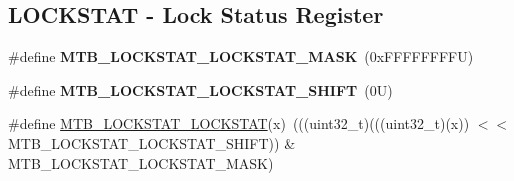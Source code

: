 \subsection*{L\+O\+C\+K\+S\+T\+AT -\/ Lock Status Register}
\begin{DoxyCompactItemize}
\item 
\mbox{\label{group___m_t_b___register___masks_ga8844dcbc4d3c0a3dcbb3ced21e84b950}} 
\#define {\bfseries M\+T\+B\+\_\+\+L\+O\+C\+K\+S\+T\+A\+T\+\_\+\+L\+O\+C\+K\+S\+T\+A\+T\+\_\+\+M\+A\+SK}~(0x\+F\+F\+F\+F\+F\+F\+F\+F\+U)
\item 
\mbox{\label{group___m_t_b___register___masks_ga198cb66f9e01cde28d71dfab52f7b66c}} 
\#define {\bfseries M\+T\+B\+\_\+\+L\+O\+C\+K\+S\+T\+A\+T\+\_\+\+L\+O\+C\+K\+S\+T\+A\+T\+\_\+\+S\+H\+I\+FT}~(0\+U)
\item 
\#define \mbox{\hyperlink{group___m_t_b___register___masks_ga7564897a50b19d58305ba8e6bb07cf14}{M\+T\+B\+\_\+\+L\+O\+C\+K\+S\+T\+A\+T\+\_\+\+L\+O\+C\+K\+S\+T\+AT}}(x)~(((uint32\+\_\+t)(((uint32\+\_\+t)(x)) $<$$<$ M\+T\+B\+\_\+\+L\+O\+C\+K\+S\+T\+A\+T\+\_\+\+L\+O\+C\+K\+S\+T\+A\+T\+\_\+\+S\+H\+I\+FT)) \& M\+T\+B\+\_\+\+L\+O\+C\+K\+S\+T\+A\+T\+\_\+\+L\+O\+C\+K\+S\+T\+A\+T\+\_\+\+M\+A\+SK)
\end{DoxyCompactItemize}
